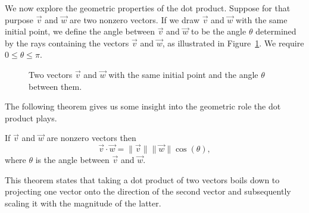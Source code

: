  We now explore the geometric properties of the dot product. Suppose for that purpose  $\vec{v}$ and $\vec{w}$ are two nonzero vectors. If we draw $\vec{v}$ and $\vec{w}$ with the same initial point, we define the angle between $\vec{v}$ and $\vec{w}$ to be the angle $\theta$ determined by the rays containing the vectors $\vec{v}$ and $\vec{w}$, as illustrated in Figure~\ref{fig_vector_12}.  We require $0 \leq \theta \leq \pi$. 

\begin{figure}[H]
\centering
\centerline{
\hspace{0.1cm}
\hspace{0.1cm}
}
\caption{Two vectors $\vec{v}$ and $\vec{w}$ with the same initial point and the angle $\theta$ between them. }
\label{fig_vector_12}
\end{figure}

The following theorem gives us some insight into the geometric role the dot product plays.


\begin{theorem} \label{dotproductgeo} 
  If $\vec{v}$ and $\vec{w}$ are nonzero vectors then 
	\begin{equation}
	\vec{v} \cdot \vec{w} = \|\vec{v}\| \|\vec{w}\| \cos(\theta),
	\label{dotproductgeoeq}
	\end{equation}
where $\theta$ is the angle between $\vec{v}$ and $\vec{w}$.  


\end{theorem}
 This theorem states that taking a dot product of two vectors boils down to projecting one vector onto the direction of the second vector and subsequently scaling it with the magnitude of the latter.

